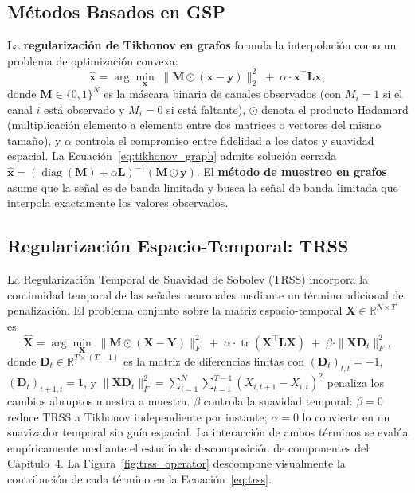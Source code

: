 \subsection{Métodos Basados en GSP}

La \textbf{regularización de Tikhonov en grafos} formula la interpolación como un problema de optimización convexa:
\begin{equation}
\hat{\mathbf{x}} = \arg\min_{\mathbf{x}} \; \|\mathbf{M} \odot (\mathbf{x} - \mathbf{y})\|_2^2 \;+\; \alpha \cdot \mathbf{x}^\top \mathbf{L} \mathbf{x},
\label{eq:tikhonov_graph}
\end{equation}
donde $\mathbf{M} \in \{0,1\}^N$ es la máscara binaria de canales observados (con $M_i = 1$ si el canal $i$ está observado y $M_i = 0$ si está faltante), $\odot$ denota el producto Hadamard (multiplicación elemento a elemento entre dos matrices o vectores del mismo tamaño), y $\alpha$ controla el compromiso entre fidelidad a los datos y suavidad espacial. La Ecuación~\ref{eq:tikhonov_graph} admite solución cerrada $\hat{\mathbf{x}} = (\operatorname{diag}(\mathbf{M}) + \alpha \mathbf{L})^{-1} (\mathbf{M} \odot \mathbf{y})$. El \textbf{método de muestreo en grafos} asume que la señal es de banda limitada y busca la señal de banda limitada que interpola exactamente los valores observados.

\subsection{Regularización Espacio-Temporal: TRSS}

La Regularización Temporal de Suavidad de Sobolev (TRSS) \cite{giraldo2022} incorpora la continuidad temporal de las señales neuronales mediante un término adicional de penalización. El problema conjunto sobre la matriz espacio-temporal $\mathbf{X} \in \mathbb{R}^{N \times T}$ es
\begin{equation}
\hat{\mathbf{X}} = \arg\min_{\mathbf{X}} \; \|\mathbf{M} \odot (\mathbf{X} - \mathbf{Y})\|_F^2 \;+\; \alpha \cdot \operatorname{tr}(\mathbf{X}^\top \mathbf{L} \mathbf{X}) \;+\; \beta \cdot \|\mathbf{X} \mathbf{D}_t\|_F^2,
\label{eq:trss}
\end{equation}
donde $\mathbf{D}_t \in \mathbb{R}^{T \times (T-1)}$ es la matriz de diferencias finitas con $(\mathbf{D}_t)_{t,t} = -1$, $(\mathbf{D}_t)_{t+1,t} = 1$, y $\|\mathbf{X} \mathbf{D}_t\|_F^2 = \sum_{i=1}^N \sum_{t=1}^{T-1} (X_{i,t+1} - X_{i,t})^2$ penaliza los cambios abruptos muestra a muestra. $\beta$ controla la suavidad temporal: $\beta = 0$ reduce TRSS a Tikhonov independiente por instante; $\alpha = 0$ lo convierte en un suavizador temporal sin guía espacial. La interacción de ambos términos se evalúa empíricamente mediante el estudio de descomposición de componentes del Capítulo~4. La Figura~\ref{fig:trss_operator} descompone visualmente la contribución de cada término en la Ecuación~\ref{eq:trss}.

